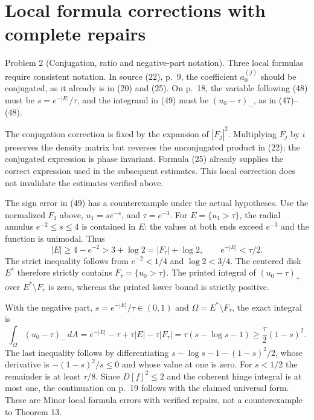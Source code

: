 \documentclass[10pt]{article}
\begin{document}
\section*{Local formula corrections with complete repairs}
Problem 2 (Conjugation, ratio and negative-part notation).  Three local formulas require consistent notation. In source (22), p. 9, the coefficient \(a_0^{(j)}\) should be conjugated, as it already is in (20) and (25). On p. 18, the variable following (48) must be \(s=e^{-|E|}/\tau\), and the integrand in (49) must be \((u_0-\tau)_-\), as in (47)–(48).\par
The conjugation correction is fixed by the expansion of \(|F_j|^2\). Multiplying \(F_j\) by \(i\) preserves the density matrix but reverses the unconjugated product in (22); the conjugated expression is phase invariant. Formula (25) already supplies the correct expression used in the subsequent estimates. This local correction does not invalidate the estimates verified above.\par
The sign error in (49) has a counterexample under the actual hypotheses. Use the normalized \(F_1\) above, \(u_1=se^{-s}\), and \(\tau=e^{-3}\). For \(E=\{u_1>\tau\}\), the radial annulus \(e^{-2}\leq s\leq4\) is contained in \(E\): the values at both ends exceed \(e^{-3}\) and the function is unimodal. Thus \[|E|\geq4-e^{-2}>3+\log2=|F_\tau|+\log2,
 \qquad e^{-|E|}<\tau/2 .\] The strict inequality follows from \(e^{-2}<1/4\) and \(\log2<3/4\). The centered disk \(E^*\) therefore strictly contains \(F_\tau=\{u_0>\tau\}\). The printed integral of \((u_0-\tau)_+\) over \(E^*\setminus F_\tau\) is zero, whereas the printed lower bound is strictly positive.\par
With the negative part, \(s=e^{-|E|}/\tau\in(0,1)\) and \(\Omega=E^*\setminus F_\tau\), the exact integral is \[\int_{\Omega}(u_0-\tau)_-\,dA
 =e^{-|E|}-\tau+\tau|E|-\tau|F_\tau|
 =\tau(s-\log s-1)
 \geq\frac{\tau}{2}(1-s)^2 .\] The last inequality follows by differentiating \(s-\log s-1-(1-s)^2/2\), whose derivative is \(-(1-s)^2/s\leq0\) and whose value at one is zero. For \(s<1/2\) the remainder is at least \(\tau/8\). Since \(D[f]^2\leq2\) and the coherent hinge integral is at most one, the continuation on p. 19 follows with the claimed universal form. These are Minor local formula errors with verified repairs, not a counterexample to Theorem 13.\par
\end{document}

